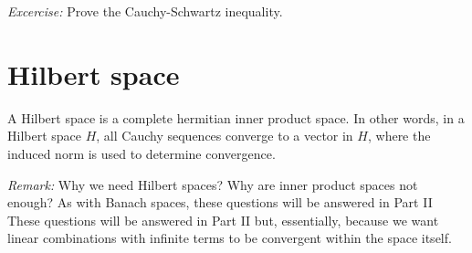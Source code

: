 \documentclass[aps,prl,twocolumn,groupedaddress]{revtex4-2}
\begin{document}
{\em Excercise:}
Prove the Cauchy-Schwartz inequality.

\section{Hilbert space}

A Hilbert space is a complete hermitian inner product space.
In other words, in a Hilbert space $H$, all Cauchy sequences converge to a vector in $H$, where the induced norm is used to determine convergence.

{\em Remark:}
Why we need Hilbert spaces?
Why are inner product spaces not enough?
As with Banach spaces, these questions will be answered in Part II These questions will be answered in Part II but, essentially, because we want linear combinations with infinite terms to be convergent within the space itself.
\end{document}
